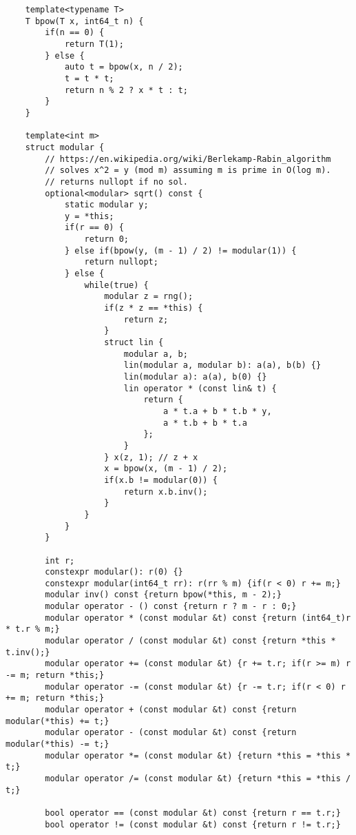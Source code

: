 \begin{lstlisting}
    template<typename T>
    T bpow(T x, int64_t n) {
        if(n == 0) {
            return T(1);
        } else {
            auto t = bpow(x, n / 2);
            t = t * t;
            return n % 2 ? x * t : t;
        }
    }

    template<int m>
    struct modular {
        // https://en.wikipedia.org/wiki/Berlekamp-Rabin_algorithm
        // solves x^2 = y (mod m) assuming m is prime in O(log m).
        // returns nullopt if no sol.
        optional<modular> sqrt() const {
            static modular y;
            y = *this;
            if(r == 0) {
                return 0;
            } else if(bpow(y, (m - 1) / 2) != modular(1)) {
                return nullopt;
            } else {
                while(true) {
                    modular z = rng();
                    if(z * z == *this) {
                        return z;
                    }
                    struct lin {
                        modular a, b;
                        lin(modular a, modular b): a(a), b(b) {}
                        lin(modular a): a(a), b(0) {}
                        lin operator * (const lin& t) {
                            return {
                                a * t.a + b * t.b * y,
                                a * t.b + b * t.a
                            };
                        }
                    } x(z, 1); // z + x
                    x = bpow(x, (m - 1) / 2);
                    if(x.b != modular(0)) {
                        return x.b.inv();
                    }
                }
            }
        }
        
        int r;
        constexpr modular(): r(0) {}
        constexpr modular(int64_t rr): r(rr % m) {if(r < 0) r += m;}
        modular inv() const {return bpow(*this, m - 2);}
        modular operator - () const {return r ? m - r : 0;}
        modular operator * (const modular &t) const {return (int64_t)r * t.r % m;}
        modular operator / (const modular &t) const {return *this * t.inv();}
        modular operator += (const modular &t) {r += t.r; if(r >= m) r -= m; return *this;}
        modular operator -= (const modular &t) {r -= t.r; if(r < 0) r += m; return *this;}
        modular operator + (const modular &t) const {return modular(*this) += t;}
        modular operator - (const modular &t) const {return modular(*this) -= t;}
        modular operator *= (const modular &t) {return *this = *this * t;}
        modular operator /= (const modular &t) {return *this = *this / t;}
        
        bool operator == (const modular &t) const {return r == t.r;}
        bool operator != (const modular &t) const {return r != t.r;}
        

\end{lstlisting}

